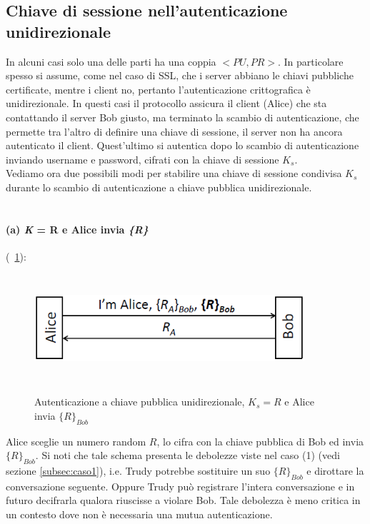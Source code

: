 \subsection{Chiave di sessione nell'autenticazione unidirezionale}
In alcuni casi solo una delle parti ha una coppia $<PU, PR>$. In particolare spesso si assume, come nel caso di SSL, che i server abbiano le chiavi pubbliche certificate, mentre i client no, pertanto l'autenticazione crittografica è unidirezionale. In questi casi il protocollo assicura il client (Alice) che sta contattando il server Bob giusto, ma terminato la scambio di autenticazione, che permette tra l'altro di definire una chiave di sessione, il server non ha ancora autenticato il client. Quest'ultimo si autentica dopo lo scambio di autenticazione inviando username e password, cifrati con la chiave di sessione $K_{s}$.\\ 
Vediamo ora due possibili modi per stabilire una chiave di sessione condivisa $K_{s}$ durante lo scambio di autenticazione a chiave pubblica unidirezionale.\\ \\
\paragraph{(a) \textit{K} = R e Alice invia \textit{\{R\}}} (\figurename~\ref{fig:ImgS81bis}): 
\begin{figure}[htbp]
	\centering%
	\subfigure%
	{\includegraphics[height=4cm, width=10cm, keepaspectratio]{Immagini/autenticazione/ImgS81bis.png}}
	\caption{Autenticazione a chiave pubblica unidirezionale, $K_{s} = R$ e Alice invia $\lbrace R\rbrace_{Bob}$}\label{fig:ImgS81bis} 	
\end{figure}
Alice sceglie un numero random $R$, lo cifra con la chiave pubblica di Bob ed invia $\lbrace R\rbrace_{Bob}$. Si noti che tale schema presenta le debolezze viste nel caso (1) (vedi sezione \ref{subsec:caso1}), i.e. Trudy potrebbe sostituire un suo $\lbrace R\rbrace_{Bob}$ e dirottare la conversazione seguente. Oppure Trudy può registrare l'intera conversazione e in futuro decifrarla qualora riuscisse a violare Bob. Tale debolezza è meno critica in un contesto dove non è necessaria una mutua autenticazione.\\ \\
